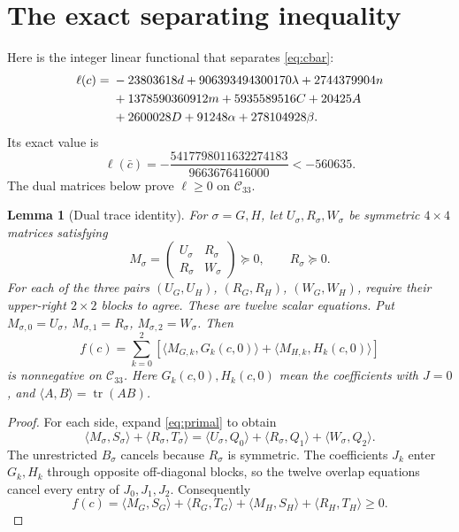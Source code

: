 \documentclass[10pt]{article}
\newtheorem{lemma}[theorem]{Lemma}
\newcommand{\R}{\mathbb R}
\newcommand{\Cq}{\mathcal C_{33}}
\newcommand{\ip}[2]{\langle #1,#2\rangle}
\newcommand{\tr}{\operatorname{tr}}
\begin{document}
\section{The exact separating inequality}
Here is the integer linear functional that separates \eqref{eq:cbar}:
\begin{align}
\ell(c)={}&-23803618d+906393494300170\lambda+2744379904n\notag\\
 &+1378590360912m+5935589516C+20425A\notag\\
 &+2600028D+91248\alpha+278104928\beta.                    \label{eq:ell}
\end{align}
Its exact value is
\begin{equation}
\boxed{\ell(\bar c)=-\frac{5417798011632274183}{9663676416000}
                    <-560635.}                            \label{eq:negative}
\end{equation}
The dual matrices below prove $\ell\geq0$ on $\Cq$.

\begin{lemma}[Dual trace identity]\label{lem:dual}
For $\sigma=G,H$, let $U_\sigma,R_\sigma,W_\sigma$ be symmetric $4\times4$
matrices satisfying
\begin{equation}
M_\sigma=\begin{pmatrix}U_\sigma&R_\sigma\\R_\sigma&W_\sigma\end{pmatrix}
\succeq0,\qquad R_\sigma\succeq0.                         \label{eq:dualPSD}
\end{equation}
For each of the three pairs $(U_G,U_H)$, $(R_G,R_H)$, $(W_G,W_H)$, require
their upper-right $2\times2$ blocks to agree. These are twelve scalar
equations. Put $M_{\sigma,0}=U_\sigma$, $M_{\sigma,1}=R_\sigma$,
$M_{\sigma,2}=W_\sigma$. Then
\begin{equation}
f(c)=\sum_{k=0}^2\left[\ip{M_{G,k}}{G_k(c,0)}
                         +\ip{M_{H,k}}{H_k(c,0)}\right]    \label{eq:f}
\end{equation}
is nonnegative on $\Cq$. Here $G_k(c,0),H_k(c,0)$ mean the coefficients
with $J=0$, and $\ip AB=\tr(AB)$.
\end{lemma}
\begin{proof}
For each side, expand \eqref{eq:primal} to obtain
\[
\ip{M_\sigma}{S_\sigma}+\ip{R_\sigma}{T_\sigma}
=\ip{U_\sigma}{Q_0}+\ip{R_\sigma}{Q_1}+\ip{W_\sigma}{Q_2}.
\]
The unrestricted $B_\sigma$ cancels because $R_\sigma$ is symmetric.
The coefficients $J_k$ enter $G_k,H_k$ through opposite off-diagonal blocks,
so the twelve overlap equations cancel every entry of $J_0,J_1,J_2$.
Consequently
\begin{equation}
f(c)=\ip{M_G}{S_G}+\ip{R_G}{T_G}
     +\ip{M_H}{S_H}+\ip{R_H}{T_H}\geq0.                  \label{eq:pairing}
\end{equation}

\end{proof}
\end{document}
